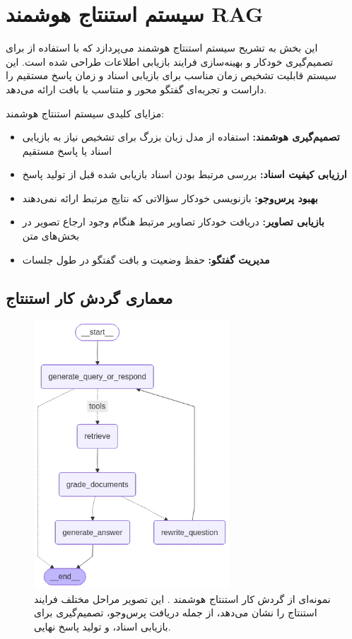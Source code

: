 
\section{سیستم استنتاج هوشمند RAG}
این بخش به تشریح سیستم استنتاج هوشمند  می‌پردازد که با استفاده از  برای تصمیم‌گیری خودکار و بهینه‌سازی فرایند بازیابی اطلاعات طراحی شده است. این سیستم قابلیت تشخیص زمان مناسب برای بازیابی اسناد و زمان پاسخ مستقیم را داراست و تجربه‌ای گفتگو محور و متناسب با بافت ارائه می‌دهد.

\noindent
مزایای کلیدی سیستم استنتاج هوشمند:
\begin{itemize}
    \item \textbf{تصمیم‌گیری هوشمند:} استفاده از مدل زبان بزرگ برای تشخیص نیاز به بازیابی اسناد یا پاسخ مستقیم
    \item \textbf{ارزیابی کیفیت اسناد:} بررسی مرتبط بودن اسناد بازیابی شده قبل از تولید پاسخ
    \item \textbf{بهبود پرس‌وجو:} بازنویسی خودکار سؤالاتی که نتایج مرتبط ارائه نمی‌دهند
    \item \textbf{بازیابی تصاویر:} دریافت خودکار تصاویر مرتبط هنگام وجود ارجاع تصویر در بخش‌های متن
    \item \textbf{مدیریت گفتگو:} حفظ وضعیت و بافت گفتگو در طول جلسات
\end{itemize}

\newpage

\subsection{معماری گردش کار استنتاج}

\begin{figure}[!htbp]
    \centering
    \includegraphics[width=0.65\textwidth]{agentic_rag_workflow.png}
    \caption{نمونه‌ای از گردش کار استنتاج هوشمند . این تصویر مراحل مختلف فرایند استنتاج را نشان می‌دهد، از جمله دریافت پرس‌وجو، تصمیم‌گیری برای بازیابی اسناد، و تولید پاسخ نهایی.}
    \label{fig:agentic_rag_workflow}
\end{figure}

